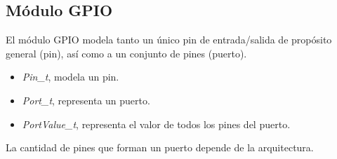 \subsection{Módulo GPIO}

El módulo GPIO modela tanto un único pin de entrada/salida de propósito general (pin), así como a un conjunto de pines (puerto). 


\begin{itemize}
\item
\emph{Pin\_t}, modela un pin.
\item
\emph{Port\_t}, representa un puerto.
\item
\emph{PortValue\_t}, representa el valor de todos los pines del puerto.
\end{itemize}

La cantidad de pines que forman un puerto depende de la arquitectura.


